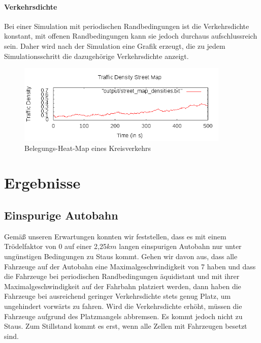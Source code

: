 \documentclass[10pt, a4paper]{article}
\begin{document}
\paragraph{Verkehrsdichte}
\label{paragraph:verkehrsdichte}

Bei einer Simulation mit periodischen Randbedingungen ist die Verkehrsdichte konstant, mit offenen Randbedingungen kann sie jedoch durchaus aufschlussreich sein. Daher wird nach der Simulation eine Grafik erzeugt, die zu jedem Simulationsschritt die dazugehörige Verkehrsdichte anzeigt.
\begin{figure}[h!]
	\centering
	\includegraphics[width=0.9\textwidth]{img/vis_street_map_densities}
	\caption{Belegungs-Heat-Map eines Kreisverkehrs}
	\label{fig:trafficDensityMapRoundabout}
\end{figure}


\section{Ergebnisse}
\label{sec:ergebnisse}

\subsection{Einspurige Autobahn}
\label{subsec:einspurig}

Gemäß unseren Erwartungen konnten wir feststellen, dass es mit einem Trödelfaktor von 0 auf einer 2,25$km$ langen einspurigen Autobahn nur unter ungünstigen Bedingungen zu Staus kommt. Gehen wir davon aus, dass alle Fahrzeuge auf der Autobahn eine Maximalgeschwindigkeit von 7 haben und dass die Fahrzeuge bei periodischen Randbedingungen äquidistant und mit ihrer Maximalgeschwindigkeit auf der Fahrbahn platziert werden, dann haben die Fahrzeuge bei ausreichend geringer Verkehrsdichte stets genug Platz, um ungehindert vorwärts zu fahren. Wird die Verkehrsdichte erhöht, müssen die Fahrzeuge aufgrund des Platzmangels abbremsen. Es kommt jedoch nicht zu Staus. Zum Stillstand kommt es erst, wenn alle Zellen mit Fahrzeugen besetzt sind.
\end{document}
